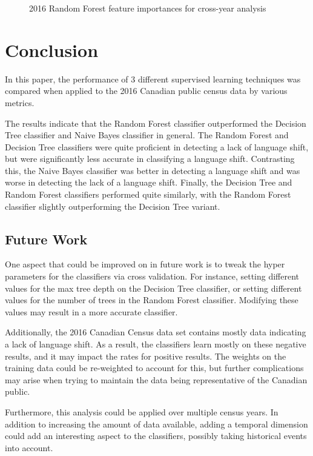 \documentclass[10pt, conference, compsocconf]{IEEEtran}
\begin{document}
{\begin{figure}[!p]
{\begin{tabular}{llll}
  \end{tabular}}
  \caption{2016 Random Forest feature importances for cross-year analysis}
  \label{fig:2016_random_forest_importances}
\end{figure}
\clearpage
}


\section{Conclusion}
In this paper, the performance of 3 different supervised learning techniques was compared when applied to the 2016 Canadian public census data by various metrics.

The results indicate that the Random Forest classifier outperformed the Decision Tree classifier and Naive Bayes classifier in general. The Random Forest and Decision Tree classifiers were quite proficient in detecting a lack of language shift, but were significantly less accurate in classifying a language shift. Contrasting this, the Naive Bayes classifier was better in detecting a language shift and was worse in detecting the lack of a language shift. Finally, the Decision Tree and Random Forest classifiers performed quite similarly, with the Random Forest classifier slightly outperforming the Decision Tree variant.


\subsection{Future Work}
One aspect that could be improved on in future work is to tweak the hyper parameters for the classifiers via cross validation. For instance, setting different values for the max tree depth on the Decision Tree classifier, or setting different values for the number of trees in the Random Forest classifier. Modifying these values may result in a more accurate classifier.

Additionally, the 2016 Canadian Census data set contains mostly data indicating a lack of language shift. As a result, the classifiers learn mostly on these negative results, and it may impact the rates for positive results. The weights on the training data could be re-weighted to account for this, but further complications may arise when trying to maintain the data being representative of the Canadian public.

Furthermore, this analysis could be applied over multiple census years. In addition to increasing the amount of data available, adding a temporal dimension could add an interesting aspect to the classifiers, possibly taking historical events into account.
\end{document}
